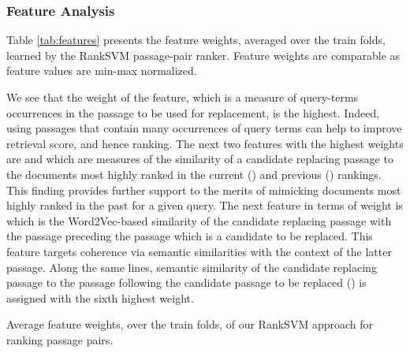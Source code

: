 \subsubsection{Feature Analysis}
Table \ref{tab:features} presents the feature weights, averaged over
the train folds, learned by the RankSVM passage-pair ranker. Feature weights are comparable as feature values are min-max
normalized.

We see that the weight of the \qryTermTarget feature,
which is a measure of query-terms occurrences in the passage to be
used for replacement, is the highest. Indeed, using passages that
contain many occurrences of query terms can help to improve retrieval
score, and hence ranking. The next two features with the highest
weights are \simTargetTopTF and \simTargetPrevTopWtV which are
measures of the similarity of a candidate replacing passage to the
documents most highly ranked in the current (\simTargetTopTF) and
previous (\simTargetPrevTopWtV) rankings. This finding provides
further support to the merits of mimicking documents most highly
ranked in the past for a given query. The next feature in terms of
weight is \simSrcPrevWtV which is the Word2Vec-based similarity of the
candidate replacing passage with the passage preceding the passage
which is a candidate to be replaced. This feature targets coherence
via semantic similarities with the context of the latter passage. Along the same lines, semantic
similarity of the candidate replacing passage to the passage following the candidate passage
to be replaced (\simTargetNextWtV) is assigned with the sixth highest
weight.


\begin{table}[t]
  \caption{\label{tab:features} Average feature weights, over the train folds, of our RankSVM approach for ranking passage pairs.}

  \center
  
\end{table}








